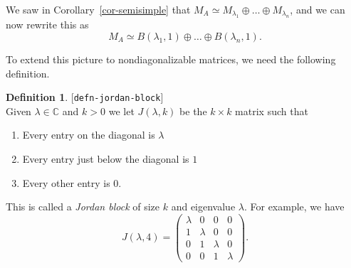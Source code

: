 \documentclass{amsart}
\newcommand{\lbl}[1]{\label{#1}\textup{[\texttt{#1}]}\ \\}
\newcommand{\lbl}{\label}
\newcommand{\C}         {{\mathbb{C}}}
\newcommand{\lm}        {\lambda}
\newcommand{\tm}        {\times}
\newcommand{\op}        {\oplus}
\renewcommand{\:}{\colon}
\theoremstyle{definition}
\newtheorem{definition}[theorem]{Definition}
\begin{document}
We saw in Corollary~\ref{cor-semisimple} that 
$M_A\simeq M_{\lm_1}\op\ldots\op M_{\lm_n}$, and we can now rewrite
this as
\[ M_A\simeq B(\lm_1,1)\op\ldots\op B(\lm_n,1). \]

To extend this picture to nondiagonalizable matrices, we need the
following definition.
\begin{definition}\lbl{defn-jordan-block}
 Given $\lm\in\C$ and $k>0$ we let $J(\lm,k)$ be the $k\tm k$ matrix
 such that
 \begin{enumerate}
 \item Every entry on the diagonal is $\lm$
 \item Every entry just below the diagonal is $1$
 \item Every other entry is $0$.
 \end{enumerate}
 This is called a \emph{Jordan block} of size $k$ and eigenvalue
 $\lm$.  For example, we have
 \[ J(\lm,4) = \left(\begin{array}{cccc}
     \lm &   0 &   0 &   0 \\
       1 & \lm &   0 &   0 \\
       0 &   1 & \lm &   0 \\
       0 &   0 &   1 & \lm
    \end{array}\right).
 \]
\end{definition}
\end{document}
